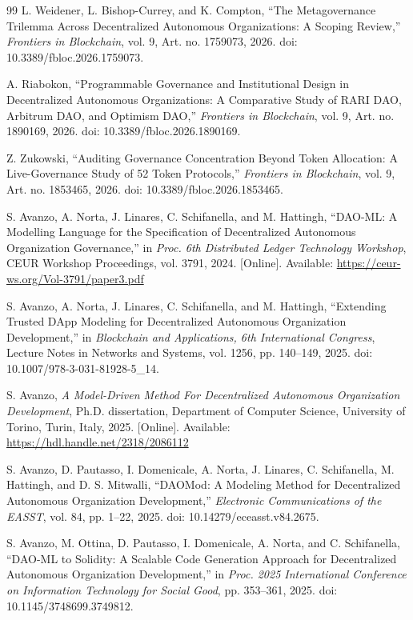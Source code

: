 \documentclass[journal]{IEEEtran}
\begin{document}
\begin{thebibliography}{99}
L. Weidener, L. Bishop-Currey, and K. Compton,
``The Metagovernance Trilemma Across Decentralized Autonomous Organizations: A Scoping Review,''
\emph{Frontiers in Blockchain}, vol. 9, Art. no. 1759073, 2026.
doi: 10.3389/fbloc.2026.1759073.

A. Riabokon,
``Programmable Governance and Institutional Design in Decentralized Autonomous Organizations: A Comparative Study of RARI DAO, Arbitrum DAO, and Optimism DAO,''
\emph{Frontiers in Blockchain}, vol. 9, Art. no. 1890169, 2026.
doi: 10.3389/fbloc.2026.1890169.

Z. Zukowski,
``Auditing Governance Concentration Beyond Token Allocation: A Live-Governance Study of 52 Token Protocols,''
\emph{Frontiers in Blockchain}, vol. 9, Art. no. 1853465, 2026.
doi: 10.3389/fbloc.2026.1853465.

S. Avanzo, A. Norta, J. Linares, C. Schifanella, and M. Hattingh,
``DAO-ML: A Modelling Language for the Specification of Decentralized Autonomous Organization Governance,''
in \emph{Proc. 6th Distributed Ledger Technology Workshop}, CEUR Workshop Proceedings, vol. 3791, 2024. [Online]. Available:
\url{https://ceur-ws.org/Vol-3791/paper3.pdf}

S. Avanzo, A. Norta, J. Linares, C. Schifanella, and M. Hattingh,
``Extending Trusted DApp Modeling for Decentralized Autonomous Organization Development,''
in \emph{Blockchain and Applications, 6th International Congress}, Lecture Notes in Networks and Systems, vol. 1256, pp. 140--149, 2025.
doi: 10.1007/978-3-031-81928-5\_14.

S. Avanzo,
\emph{A Model-Driven Method For Decentralized Autonomous Organization Development},
Ph.D. dissertation, Department of Computer Science,
University of Torino, Turin, Italy, 2025.
[Online]. Available: \url{https://hdl.handle.net/2318/2086112}

S. Avanzo, D. Pautasso, I. Domenicale, A. Norta, J. Linares, C. Schifanella, M. Hattingh, and D. S. Mitwalli,
``DAOMod: A Modeling Method for Decentralized Autonomous Organization Development,''
\emph{Electronic Communications of the EASST}, vol. 84, pp. 1--22, 2025.
doi: 10.14279/eceasst.v84.2675.

S. Avanzo, M. Ottina, D. Pautasso, I. Domenicale, A. Norta, and C. Schifanella,
``DAO-ML to Solidity: A Scalable Code Generation Approach for Decentralized Autonomous Organization Development,''
in \emph{Proc. 2025 International Conference on Information Technology for Social Good}, pp. 353--361, 2025.
doi: 10.1145/3748699.3749812.


\end{thebibliography}
\end{document}

